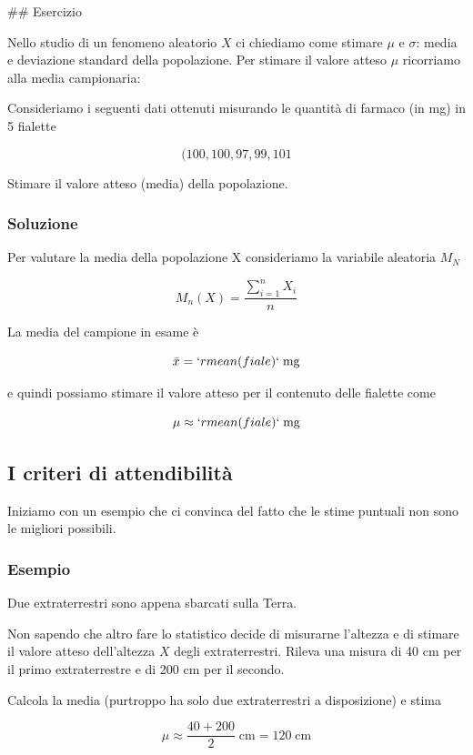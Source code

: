 \documentclass[onecolumn,12pt]{book}\usepackage[]{graphicx}\usepackage[]{color}
\begin{document}
## Esercizio 

Nello studio di un fenomeno aleatorio $X$ ci chiediamo come stimare $\mu$  e $\sigma$: media e deviazione standard della popolazione. Per stimare il valore atteso $\mu$  ricorriamo alla media campionaria:



Consideriamo i  seguenti dati ottenuti misurando le quantità  di farmaco (in mg) in 5 fialette 

\[(100, 100, 97, 99, 101\]

Stimare il valore atteso (media) della popolazione.

\subsubsection{Soluzione}

Per valutare la media della popolazione X consideriamo la variabile aleatoria  $M_N$

\[M_n(X)=\dfrac{\sum_{i=1}^n X_i}{n}\]
 
La media del campione in esame è  

\[ \bar x = `r mean(fiale)`\; \mathrm{ mg}\]

e quindi  possiamo stimare  il valore atteso per il contenuto delle fialette come

\[\mu\approx  `r mean(fiale)` \;\mathrm{ mg}\]

\subsection{I criteri di attendibilità}  

Iniziamo con un esempio che ci convinca del fatto che le stime puntuali non sono le migliori possibili. 


\subsubsection{Esempio}

Due extraterrestri sono appena sbarcati sulla Terra. 

Non sapendo che altro fare lo statistico decide di misurarne l'altezza e di stimare il valore atteso dell'altezza $X$ degli extraterrestri.  Rileva una misura di 40 cm per il primo extraterrestre e di  200 cm per il secondo. 

Calcola la media (purtroppo ha solo due extraterrestri a disposizione) e stima

$$\mu   \approx \frac{40 + 200}{2}\; \mathrm{ cm} = 120\; \mathrm{ cm}$$
\end{document}
